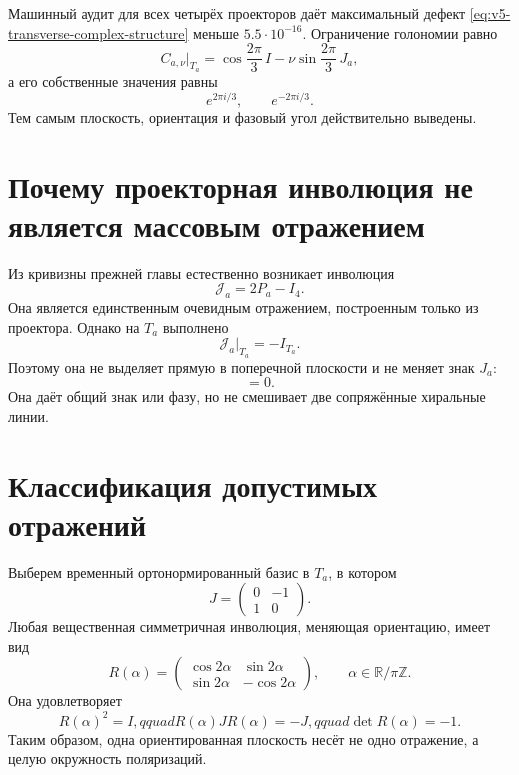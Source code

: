 Машинный аудит для всех четырёх проекторов даёт максимальный дефект
\eqref{eq:v5-transverse-complex-structure} меньше
$5.5\cdot10^{-16}$. Ограничение голономии равно
\begin{equation}
 C_{a,\nu}|_{T_a}
 =\cos\frac{2\pi}{3}\,I
 -\nu\sin\frac{2\pi}{3}\,J_a,
\end{equation}
а его собственные значения равны
\begin{equation}
 e^{2\pi i/3},\qquad e^{-2\pi i/3}.
\end{equation}
Тем самым плоскость, ориентация и фазовый угол действительно выведены.

\section{Почему проекторная инволюция не является массовым отражением}

Из кривизны прежней главы естественно возникает инволюция
\begin{equation}
 \mathcal J_a=2P_a-I_4.
\end{equation}
Она является единственным очевидным отражением, построенным только из
проектора. Однако на $T_a$ выполнено
\begin{equation}
 \mathcal J_a|_{T_a}=-I_{T_a}.
 \label{eq:v5-projector-involution-transverse}
\end{equation}
Поэтому она не выделяет прямую в поперечной плоскости и не меняет знак
$J_a$:
\begin{equation}
 [\mathcal J_a,J_a]=0.
\end{equation}
Она даёт общий знак или фазу, но не смешивает две сопряжённые хиральные
линии.

\section{Классификация допустимых отражений}

Выберем временный ортонормированный базис в $T_a$, в котором
\begin{equation}
 J=\begin{pmatrix}0&-1\\1&0\end{pmatrix}.
\end{equation}
Любая вещественная симметричная инволюция, меняющая ориентацию,
имеет вид
\begin{equation}
 R(\alpha)=
 \begin{pmatrix}
  \cos2\alpha&\sin2\alpha\\
  \sin2\alpha&-\cos2\alpha
 \end{pmatrix},
 \qquad \alpha\in\mathbb R/\pi\mathbb Z.
 \label{eq:v5-reflection-circle}
\end{equation}
Она удовлетворяет
\begin{equation}
 R(\alpha)^2=I,qquad
 R(\alpha)JR(\alpha)=-J,qquad
 \det R(\alpha)=-1.
\end{equation}
Таким образом, одна ориентированная плоскость несёт не одно отражение, а
целую окружность поляризаций.

